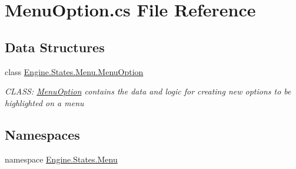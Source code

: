 \hypertarget{a00218}{}\section{Menu\+Option.\+cs File Reference}
\label{a00218}
\subsection*{Data Structures}
\begin{DoxyCompactItemize}
\item 
class \hyperlink{a00582}{Engine.\+States.\+Menu.\+Menu\+Option}
\begin{DoxyCompactList}\small\item\em C\+L\+A\+SS\+: \hyperlink{a00582}{Menu\+Option} contains the data and logic for creating new options to be highlighted on a menu \end{DoxyCompactList}\end{DoxyCompactItemize}
\subsection*{Namespaces}
\begin{DoxyCompactItemize}
\item 
namespace \hyperlink{a00280}{Engine.\+States.\+Menu}
\end{DoxyCompactItemize}
